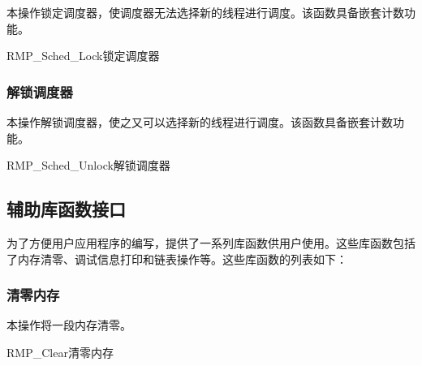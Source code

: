 本操作锁定调度器，使调度器无法选择新的线程进行调度。该函数具备嵌套计数功能。

\begin{apidesc}{RMP\_Sched\_Lock}{锁定调度器}
    \begin{apiparams}
    \end{apiparams}
    \begin{apiret}
    \end{apiret}
\end{apidesc}

\subsubsection{解锁调度器}\label{subsubsec:unlock-the-scheduler}

本操作解锁调度器，使之又可以选择新的线程进行调度。该函数具备嵌套计数功能。

\begin{apidesc}{RMP\_Sched\_Unlock}{解锁调度器}
    \begin{apiparams}
    \end{apiparams}
    \begin{apiret}
    \end{apiret}
\end{apidesc}

\subsection{辅助库函数接口}\label{subsec:auxiliary-library-function-interface}

为了方便用户应用程序的编写，提供了一系列库函数供用户使用。这些库函数包括了内存清零、调试信息打印和链表操作等。这些库函数的列表如下：

\subsubsection{清零内存}\label{subsubsec:clear-memory}

本操作将一段内存清零。

\begin{apidesc}{RMP\_Clear}{清零内存}
    \begin{apiparams}
    \end{apiparams}
    \begin{apiret}
    \end{apiret}
\end{apidesc}

